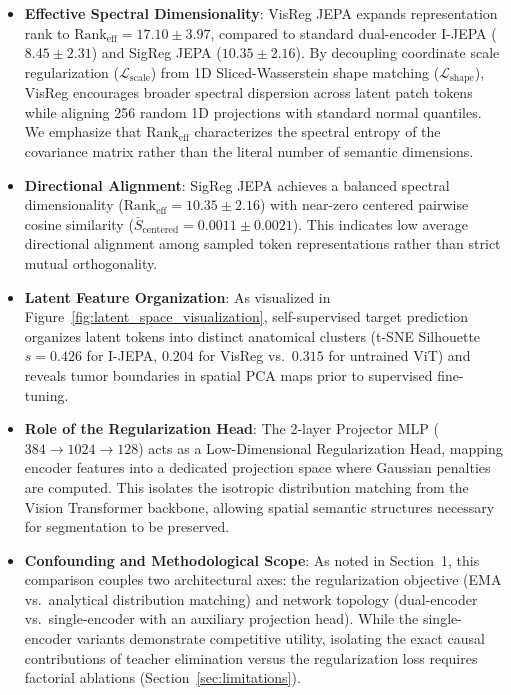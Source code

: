 \documentclass{article}
\begin{document}
\begin{itemize}
    \item \textbf{Effective Spectral Dimensionality}: VisReg JEPA expands representation rank to $\text{Rank}_{\text{eff}} = \mathbf{17.10 \pm 3.97}$, compared to standard dual-encoder I-JEPA ($8.45 \pm 2.31$) and SigReg JEPA ($10.35 \pm 2.16$). By decoupling coordinate scale regularization ($\mathcal{L}_{\text{scale}}$) from 1D Sliced-Wasserstein shape matching ($\mathcal{L}_{\text{shape}}$), VisReg encourages broader spectral dispersion across latent patch tokens while aligning 256 random 1D projections with standard normal quantiles. We emphasize that $\text{Rank}_{\text{eff}}$ characterizes the spectral entropy of the covariance matrix rather than the literal number of semantic dimensions.
    \item \textbf{Directional Alignment}: SigReg JEPA achieves a balanced spectral dimensionality ($\text{Rank}_{\text{eff}} = 10.35 \pm 2.16$) with near-zero centered pairwise cosine similarity ($\bar{S}_{\text{centered}} = \mathbf{0.0011 \pm 0.0021}$). This indicates low average directional alignment among sampled token representations rather than strict mutual orthogonality.
    \item \textbf{Latent Feature Organization}: As visualized in Figure~\ref{fig:latent_space_visualization}, self-supervised target prediction organizes latent tokens into distinct anatomical clusters (t-SNE Silhouette $s=0.426$ for I-JEPA, $0.204$ for VisReg vs.\ $0.315$ for untrained ViT) and reveals tumor boundaries in spatial PCA maps prior to supervised fine-tuning.
    \item \textbf{Role of the Regularization Head}: The 2-layer Projector MLP ($384 \to 1024 \to 128$) acts as a Low-Dimensional Regularization Head, mapping encoder features into a dedicated projection space where Gaussian penalties are computed. This isolates the isotropic distribution matching from the Vision Transformer backbone, allowing spatial semantic structures necessary for segmentation to be preserved.
    \item \textbf{Confounding and Methodological Scope}: As noted in Section~1, this comparison couples two architectural axes: the regularization objective (EMA vs.\ analytical distribution matching) and network topology (dual-encoder vs.\ single-encoder with an auxiliary projection head). While the single-encoder variants demonstrate competitive utility, isolating the exact causal contributions of teacher elimination versus the regularization loss requires factorial ablations (Section~\ref{sec:limitations}).
\end{itemize}
\end{document}
